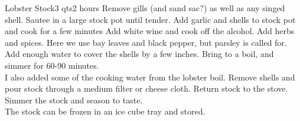 \begin{recipe}{Lobster Stock}{3 qts}{2 hours}
Remove gills (and sand sac?) as well as any singed shell.
Sautee in a large stock pot until tender.
Add garlic and shells to stock pot and cook for a few minutes
Add white wine and cook off the alcohol.
Add herbs and spices. Here we use bay leaves and black pepper, but
parsley is called for.
 Add enough water to cover the shells by a few inches. Bring to a boil, and simmer for 60-90 minutes.\\
\freeform I also added some of the cooking water from the lobster boil.  Remove shells and pour stock through a medium filter or cheese cloth.  Return stock to the stove.\\
Simmer the stock and season to taste.\\
\freeform The stock can be frozen in an ice cube tray and stored.
\end{recipe}

